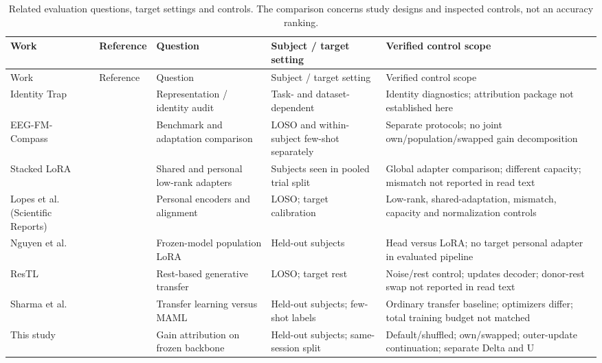 \begin{longtable}{p{.8in}p{1.05in}p{1.05in}p{1.15in}p{2.15in}}
\caption{Related evaluation questions, target settings and controls. The comparison concerns study designs and inspected controls, not an accuracy ranking.}\label{tab:related}\\
\toprule
Work & Reference & Question & Subject / target setting & Verified control scope \\
\midrule
\endfirsthead
\toprule
Work & Reference & Question & Subject / target setting & Verified control scope \\
\midrule
\endhead
Identity Trap & \citep{lin2026identity} & Representation / identity audit & Task- and dataset-dependent & Identity diagnostics; attribution package not established here \\
EEG-FM-Compass & \citep{liu2026compass} & Benchmark and adaptation comparison & LOSO and within-subject few-shot separately & Separate protocols; no joint own/population/swapped gain decomposition \\
Stacked LoRA & \citep{sarhane2026stacked} & Shared and personal low-rank adapters & Subjects seen in pooled trial split & Global adapter comparison; different capacity; mismatch not reported in read text \\
Lopes et al. (Scientific Reports) & \citep{lopes2026published} & Personal encoders and alignment & LOSO; target calibration & Low-rank, shared-adaptation, mismatch, capacity and normalization controls \\
Nguyen et al. & \citep{nguyen2026stroke} & Frozen-model population LoRA & Held-out subjects & Head versus LoRA; no target personal adapter in evaluated pipeline \\
ResTL & \citep{an2024restl} & Rest-based generative transfer & LOSO; target rest & Noise/rest control; updates decoder; donor-rest swap not reported in read text \\
Sharma et al. & \citep{sharma2024fast} & Transfer learning versus MAML & Held-out subjects; few-shot labels & Ordinary transfer baseline; optimizers differ; total training budget not matched \\
This study &  & Gain attribution on frozen backbone & Held-out subjects; same-session split & Default/shuffled; own/swapped; outer-update continuation; separate Delta and U \\
\bottomrule
\end{longtable}
